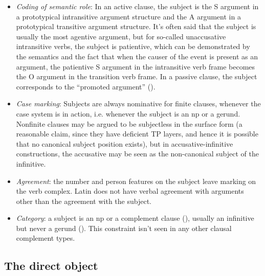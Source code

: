\documentclass[a4paper, oneside, 12pt]{report}
\begin{document}
\begin{itemize}
    \item \emph{Coding of semantic role}: In an active clause, 
    the subject 
    is the S argument in a prototypical intransitive argument structure 
    and the A argument in a prototypical transitive argument structure.
    It's often said that the subject is usually the most agentive argument,
    but for so-called unaccusative intransitive verbs, 
    the subject is patientive,
    which can be demonstrated by the semantics 
    and the fact that when the causer of the event is present as an argument, 
    the patientive S argument in the intransitive verb frame
    becomes the O argument in the transition verb frame.
    In a passive clause, 
    the subject corresponds to the ``promoted argument'' ().  
    \item \emph{Case marking}: 
    Subjects are always nominative for finite clauses,
    whenever the case system is in action,
    i.e. whenever the subject is an \ac{np} or a gerund. 
    Nonfinite clauses may be argued to be subjectless in the surface form 
    (a reasonable claim, since they have deficient TP layers, 
    and hence it is possible that no canonical subject position exists),
    but in accusative-infinitive constructions, %
    the accusative may be seen as the non-canonical subject of the infinitive.
    \item \emph{Agreement}: 
    the number and person features on the subject leave marking on the verb complex.
    Latin does not have verbal agreement with arguments other than the agreement with the subject.
    \item \emph{Category}: a subject is an \ac{np}  
    or a complement clause (), 
    usually an infinitive but never a gerund ().
    This constraint isn't seen in any other clausal complement types.
\end{itemize}


\subsection{The direct object}\label{sec:vp.complement.direct-object}
\end{document}
